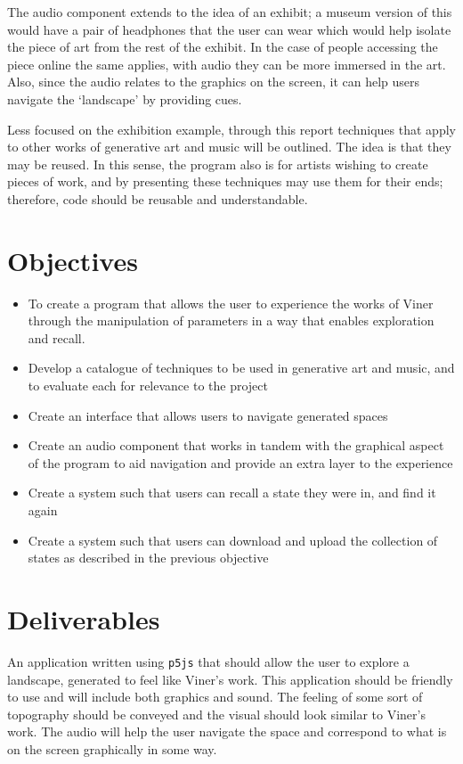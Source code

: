 The audio component extends to the idea of an exhibit; a museum version of this
would have a pair of headphones that the user can wear which would help isolate the
piece of art from the rest of the exhibit. In the case of people accessing the
piece online the same applies, with audio they can be more immersed in the art.
Also, since the audio relates to the graphics on the screen, it can help users
navigate the `landscape' by providing cues.

Less focused on the exhibition example, through this report techniques that
apply to other works of generative art and music will be outlined. The idea is
that they may be reused. In this sense, the program also is for artists wishing
to create pieces of work, and by presenting these techniques may use them for
their ends; therefore, code should be reusable and understandable.

\section{Objectives}
\begin{itemize}
    \item To create a program that allows the user to experience the works of
        Viner through the manipulation of parameters in a way that enables
        exploration and recall.
    \item Develop a catalogue of techniques to be used in generative art and
        music, and to evaluate each for relevance to the project
    \item Create an interface that allows users to navigate generated spaces
    \item Create an audio component that works in tandem with the graphical aspect
        of the program to aid navigation and provide an extra layer to the
        experience
    \item Create a system such that users can recall a state they were
        in, and find it again
    \item Create a system such that users can download and upload the collection
        of states as described in the previous objective
\end{itemize}

\section{Deliverables}
An application written using \verb|p5js| that should allow the user to explore a
landscape, generated to feel like Viner's work. This application should be
friendly to use and will include both graphics and sound. The feeling of some
sort of topography should be conveyed and the visual should look similar to
Viner's work. The audio will help the user navigate the space and correspond to
what is on the screen graphically in some way.

